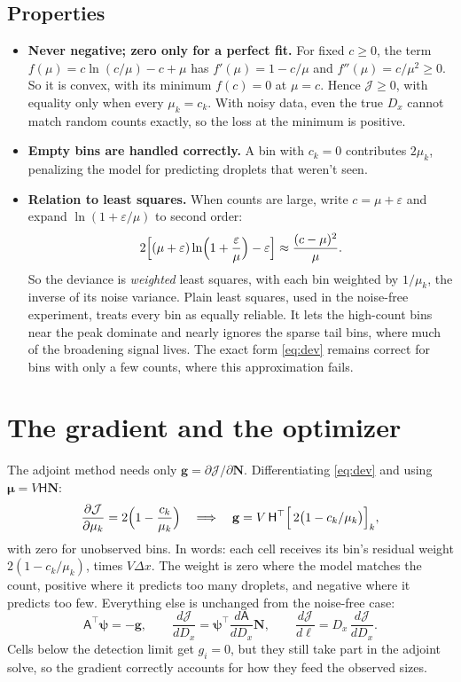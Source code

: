 \documentclass[11pt]{article}
\newcommand{\J}{\mathcal{J}}
\newcommand{\A}{\mathsf{A}}
\newcommand{\Hm}{\mathsf{H}}
\newcommand{\N}{\mathbf{N}}
\newcommand{\bpsi}{\bm{\psi}}
\newcommand{\bmu}{\bm{\mu}}
\begin{document}
\subsection{Properties}
\begin{itemize}
\item \textbf{Never negative; zero only for a perfect fit.} For fixed $c\ge0$, the term $f(\mu) = c\ln(c/\mu) - c + \mu$ has $f'(\mu) = 1 - c/\mu$ and $f''(\mu) = c/\mu^2\ge0$. So it is convex, with its minimum $f(c) = 0$ at $\mu = c$. Hence $\J\ge0$, with equality only when every $\mu_k = c_k$. With noisy data, even the true $D_x$ cannot match random counts exactly, so the loss at the minimum is positive.
\item \textbf{Empty bins are handled correctly.} A bin with $c_k = 0$ contributes $2\mu_k$, penalizing the model for predicting droplets that weren't seen.
\item \textbf{Relation to least squares.} When counts are large, write $c = \mu + \varepsilon$ and expand $\ln(1 + \varepsilon/\mu)$ to second order:
\[
2\Bigl[(\mu+\varepsilon)\ln\Bigl(1+\frac{\varepsilon}{\mu}\Bigr) - \varepsilon\Bigr] \approx \frac{(c-\mu)^2}{\mu}.
\]
So the deviance is \emph{weighted} least squares, with each bin weighted by $1/\mu_k$, the inverse of its noise variance. Plain least squares, used in the noise-free experiment, treats every bin as equally reliable. It lets the high-count bins near the peak dominate and nearly ignores the sparse tail bins, where much of the broadening signal lives. The exact form \eqref{eq:dev} remains correct for bins with only a few counts, where this approximation fails.
\end{itemize}

\section{The gradient and the optimizer}\label{sec:gradient}
The adjoint method needs only $\mathbf{g} = \partial\J/\partial\N$. Differentiating \eqref{eq:dev} and using $\bmu = V\Hm\N$:
\begin{equation}\label{eq:g}
\frac{\partial\J}{\partial\mu_k} = 2\Bigl(1 - \frac{c_k}{\mu_k}\Bigr)
\quad\Longrightarrow\quad
\mathbf{g} = V\,\Hm^\top\Bigl[\,2\bigl(1 - c_k/\mu_k\bigr)\Bigr]_k ,
\end{equation}
with zero for unobserved bins. In words: each cell receives its bin's residual weight $2(1 - c_k/\mu_k)$, times $V\Delta x$. The weight is zero where the model matches the count, positive where it predicts too many droplets, and negative where it predicts too few. Everything else is unchanged from the noise-free case:
\begin{equation}\label{eq:adjoint}
\A^\top\bpsi = -\mathbf{g},\qquad \frac{d\J}{dD_x} = \bpsi^\top\frac{d\A}{dD_x}\N,\qquad \frac{d\J}{d\ell} = D_x\,\frac{d\J}{dD_x}.
\end{equation}
Cells below the detection limit get $g_i = 0$, but they still take part in the adjoint solve, so the gradient correctly accounts for how they feed the observed sizes.
\end{document}
